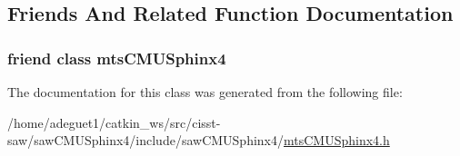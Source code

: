 \subsection{Friends And Related Function Documentation}
\hypertarget{classmts_c_m_u_sphinx4_1_1_context_a9fe1241bdee240deba664bfbaadf5301}{
\subsubsection[{mts\-C\-M\-U\-Sphinx4}]{\setlength{\rightskip}{0pt plus 5cm}friend class {\bf mts\-C\-M\-U\-Sphinx4}\hspace{0.3cm}{\ttfamily [friend]}}}\label{classmts_c_m_u_sphinx4_1_1_context_a9fe1241bdee240deba664bfbaadf5301}


The documentation for this class was generated from the following file\-:\begin{DoxyCompactItemize}
\item 
/home/adeguet1/catkin\-\_\-ws/src/cisst-\/saw/saw\-C\-M\-U\-Sphinx4/include/saw\-C\-M\-U\-Sphinx4/\hyperlink{mts_c_m_u_sphinx4_8h}{mts\-C\-M\-U\-Sphinx4.\-h}\end{DoxyCompactItemize}
